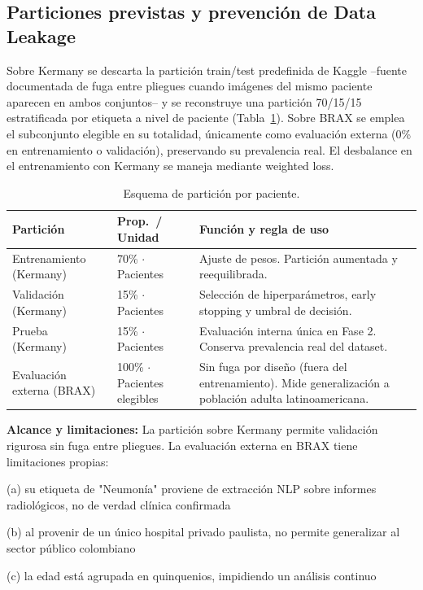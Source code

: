 \documentclass[11pt]{article}
\begin{document}
\subsection{Particiones previstas y prevención de Data Leakage}

Sobre Kermany se descarta la partición train/test predefinida de Kaggle --fuente documentada de fuga entre pliegues cuando imágenes del mismo paciente aparecen en ambos conjuntos-- y se reconstruye una partición 70/15/15 estratificada por etiqueta a nivel de paciente (Tabla~\ref{tab:particiones}). Sobre BRAX se emplea el subconjunto elegible en su totalidad, únicamente como evaluación externa (0\% en entrenamiento o validación), preservando su prevalencia real. El desbalance en el entrenamiento con Kermany se maneja mediante weighted loss.

\begin{table}[h]
\centering
\small
\caption{Esquema de partición por paciente.}
\label{tab:particiones}
\begin{tabular}{@{}llp{7cm}@{}}
\toprule
\textbf{Partición} & \textbf{Prop.\ / Unidad} & \textbf{Función y regla de uso} \\
\midrule
Entrenamiento (Kermany) & 70\% $\cdot$ Pacientes & Ajuste de pesos. Partición aumentada y reequilibrada. \\
Validación (Kermany) & 15\% $\cdot$ Pacientes & Selección de hiperparámetros, early stopping y umbral de decisión. \\
Prueba (Kermany) & 15\% $\cdot$ Pacientes & Evaluación interna única en Fase 2. Conserva prevalencia real del dataset. \\
Evaluación externa (BRAX) & 100\% $\cdot$ Pacientes elegibles & Sin fuga por diseño (fuera del entrenamiento). Mide generalización a población adulta latinoamericana. \\
\bottomrule
\end{tabular}
\end{table}

\textbf{Alcance y limitaciones:} La partición sobre Kermany permite validación rigurosa sin fuga entre pliegues. La evaluación externa en BRAX tiene limitaciones propias:

(a) su etiqueta de "Neumonía" proviene de extracción NLP sobre informes radiológicos, no de verdad clínica confirmada

(b) al provenir de un único hospital privado paulista, no permite generalizar al sector público colombiano

(c) la edad está agrupada en quinquenios, impidiendo un análisis continuo
\end{document}
